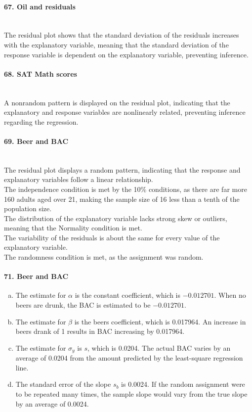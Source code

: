 \documentclass[../Homework]{subfiles}
\begin{document}
		\paragraph{67. Oil and residuals}\ \\
			The residual plot shows that the standard deviation of the residuals increases with the explanatory variable, meaning that the standard deviation of the response variable is dependent on the explanatory variable, preventing inference.
		\paragraph{68. SAT Math scores}\ \\
			A nonrandom pattern is displayed on the residual plot, indicating that the explanatory and response variables are nonlinearly related, preventing inference regarding the regression.
		\paragraph{69. Beer and BAC}\ \\
			The residual plot displays a random pattern, indicating that the response and explanatory variables follow a linear relationship. \\
			The independence condition is met by the 10\% conditions, as there are far more 160 adults aged over 21, making the sample size of 16 less than a tenth of the population size. \\
			The distribution of the explanatory variable lacks strong skew or outliers, meaning that the Normality condition is met. \\
			The variability of the residuals is about the same for every value of the explanatory variable. \\
			The randomness condition is met, as the assignment was random.
		\paragraph{71. Beer and BAC}
			\begin{enumerate}[a.]
				\item
					The estimate for $\alpha$ is the constant coefficient, which is $-0.012701$. When no beers are drunk, the BAC is estimated to be $-0.012701$.
				\item
					The estimate for $\beta$ is the beers coefficient, which is 0.017964. An increase in beers drank of 1 results in BAC increasing by 0.017964.
				\item
					The estimate for $\sigma_y$ is $s$, which is 0.0204. The actual BAC varies by an average of 0.0204 from the amount predicted by the least-square regression line.
				\item
					The standard error of the slope $s_b$ is 0.0024. If the random assignment were to be repeated many times, the sample slope would vary from the true slope by an average of 0.0024.
			\end{enumerate}
\end{document}
